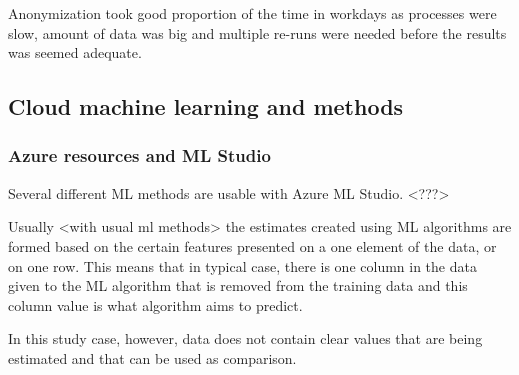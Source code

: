 \documentclass[english, 12pt, a4paper, elec, utf8, a-1b, online]{aaltothesis}
\begin{document}
Anonymization took good proportion of the time in workdays
as processes were slow,
amount of data was big
and multiple re-runs were needed
before the results was seemed adequate.


\subsection{Cloud machine learning and methods}\label{subsec:cloud-ml-and-methods}

\subsubsection*{Azure resources and ML Studio}
Several different ML methods are usable with Azure ML Studio. <???>

Usually <with usual ml methods> the estimates
created using ML algorithms
are formed based on the certain features
presented on a one element of the data,
or on one row.
This means that in typical case,
there is one column in the data
given to the ML algorithm
that is removed from the training data
and this column value is what algorithm
aims to predict.

In this study case, however,
data does not contain clear values
that are being estimated
and that can be used as comparison.
\end{document}
